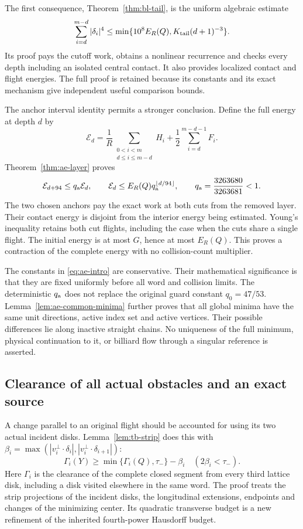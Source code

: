 \documentclass[11pt,reqno]{amsart}
\numberwithin{equation}{section}
\theoremstyle{definition}\newtheorem{definition}[theorem]{Definition}
\theoremstyle{remark}\newtheorem{remark}[theorem]{Remark}
\begin{document}
The first consequence, Theorem~\ref{thm:bl-tail}, is the uniform
algebraic estimate
\[
 \sum_{i=d}^{m-d}|\delta_i|^4
 \le\min\{10^8E_R(Q),K_{\rm tail}(d+1)^{-3}\}.
\]
Its proof pays the cutoff work, obtains a nonlinear recurrence and
checks every depth including an isolated central contact.  It also
provides localized contact and flight energies.  The full proof
is retained because its constants and its exact mechanism give
independent useful comparison bounds.

The anchor interval identity permits a stronger conclusion.
Define the full energy at depth $d$ by
\[
 \mathcal E_d=\frac1R
  \sum_{\substack{0<i<m\\ d\le i\le m-d}}H_i
            +\frac12\sum_{i=d}^{m-d-1}F_i.
\]
Theorem~\ref{thm:ae-layer} proves
\begin{equation}\label{eq:ae-intro}
 \mathcal E_{d+94}\le q_{\rm a}\mathcal E_d,\qquad
 \mathcal E_d\le E_R(Q)q_{\rm a}^{\lfloor d/94\rfloor},
 \qquad q_{\rm a}=\frac{3263680}{3263681}<1.
\end{equation}
The two chosen anchors pay the exact work at both cuts from the
removed layer.  Their contact energy is disjoint from the interior
energy being estimated.  Young's inequality retains both cut
flights, including the case when the cuts share a single flight.
The initial energy is at most $G$, hence at most $E_R(Q)$.
This proves a contraction of the complete energy with no
collision-count multiplier.

The constants in \eqref{eq:ae-intro} are conservative.  Their
mathematical significance is that they are fixed uniformly before
all word and collision limits.  The deterministic $q_{\rm a}$
does not replace the original guard constant $q_0=47/53$.
Lemma~\ref{lem:ae-common-minima} further proves that all global
minima have the same unit directions, active index set and active
vertices.  Their possible differences lie along inactive straight
chains.  No uniqueness of the full minimum, physical continuation
to it, or billiard flow through a singular reference is asserted.

\subsection*{Clearance of all actual obstacles and an exact source}
A change parallel to an original flight should be accounted for
using its two actual incident disks.  Lemma~\ref{lem:tb-strip}
does this with
$\beta_i=\max(|v_i^\perp\cdot\delta_i|,
             |v_i^\perp\cdot\delta_{i+1}|)$:
\[
 \Gamma_i(Y)\ge\min\{\Gamma_i(Q),\tau_-\}-\beta_i
                              \quad(2\beta_i<\tau_-).
\]
Here $\Gamma_i$ is the clearance of the complete closed segment
from every third lattice disk, including a disk visited elsewhere
in the same word.  The proof treats the strip projections of the
incident disks, the longitudinal extensions, endpoints and changes
of the minimizing center.  Its quadratic transverse budget is a
new refinement of the inherited fourth-power Hausdorff budget.
\end{document}
